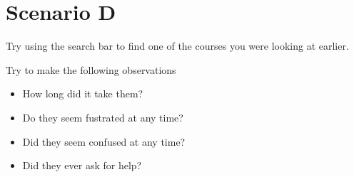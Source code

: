 \documentclass[11pt]{article} %
\begin{document}
\section{Scenario D}
Try using the search bar to find one of the courses you were looking at earlier.

Try to make the following observations
\begin{itemize}
    \item How long did it take them?
    \item Do they seem fustrated at any time?
    \item Did they seem confused at any time?
    \item Did they ever ask for help?
\end{itemize}
\newpage
\end{document}
